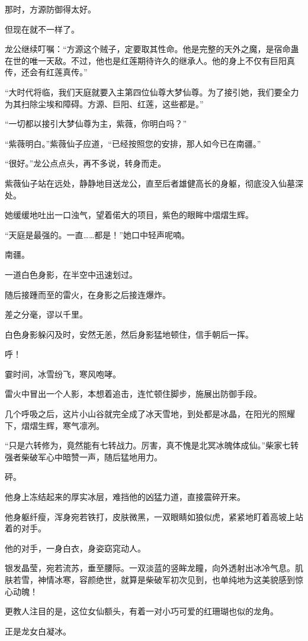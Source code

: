 \begin{this_body}
那时，方源防御得太好。

但现在就不一样了。

龙公继续叮嘱：“方源这个贼子，定要取其性命。他是完整的天外之魔，是宿命蛊在世的唯一天敌。不过，他也是红莲期待许久的继承人。他的身上不仅有巨阳真传，还会有红莲真传。”

“大时代将临，我们天庭就要入主第四位仙尊大梦仙尊。为了接引她，我们要全力为其扫除尘埃和障碍。方源、巨阳、红莲，这些都是。”

“一切都以接引大梦仙尊为主，紫薇，你明白吗？”

“紫薇明白。”紫薇仙子应道，“已经按照您的安排，那人如今已在南疆。”

“很好。”龙公点点头，再不多说，转身而走。

紫薇仙子站在远处，静静地目送龙公，直至后者雄健高长的身躯，彻底没入仙墓深处。

她缓缓地吐出一口浊气，望着偌大的项目，紫色的眼眸中熠熠生辉。

“天庭是最强的。一直……都是！”她口中轻声呢喃。

南疆。

一道白色身影，在半空中迅速划过。

随后接踵而至的雷火，在身影之后接连爆炸。

差之分毫，谬以千里。

白色身影躲闪及时，安然无恙，然后身影猛地顿住，信手朝后一挥。

呼！

霎时间，冰雪纷飞，寒风咆哮。

雷火中冒出一个人影，本想着追击，连忙顿住脚步，施展出防御手段。

几个呼吸之后，这片小山谷就完全成了冰天雪地，到处都是冰晶，在阳光的照耀下，熠熠生辉，寒气凛冽。

“只是六转修为，竟然能有七转战力。厉害，真不愧是北冥冰魄体成仙。”柴家七转强者柴破军心中暗赞一声，随后猛地用力。

砰。

他身上冻结起来的厚实冰层，难挡他的凶猛力道，直接震碎开来。

他身躯纤瘦，浑身宛若铁打，皮肤微黑，一双眼睛如狼似虎，紧紧地盯着高坡上站着的对手。

他的对手，一身白衣，身姿窈窕动人。

银发晶莹，宛若流苏，垂至腰际。一双淡蓝的竖眸龙瞳，向外透射出冰冷气息。肌肤若雪，神情冰寒，容颜绝世，就算是柴破军初次见到，也单纯地为这美貌感到惊心动魄！

更教人注目的是，这位女仙额头，有着一对小巧可爱的红珊瑚也似的龙角。

正是龙女白凝冰。


\end{this_body}
